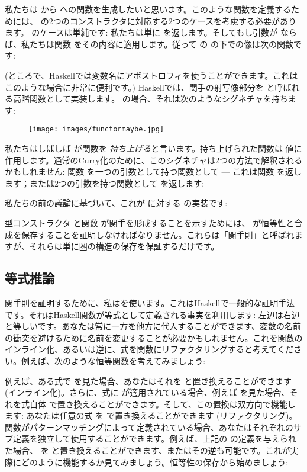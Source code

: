 私たちは  から  への関数を生成したいと思います。このような関数を定義するためには、 の2つのコンストラクタに対応する2つのケースを考慮する必要があります。 のケースは単純です: 私たちは単に  を返します。そしてもし引数が  ならば、私たちは関数  をその内容に適用します。従って  の  の下での像は次の関数です: 

 (ところで、Haskellでは変数名にアポストロフィを使うことができます。これはこのような場合に非常に便利です。) Haskellでは、関手の射写像部分を  と呼ばれる高階関数として実装します。 の場合、それは次のようなシグネチャを持ちます: 


\begin{figure}[H]
  \centering
  \texttt{[image: images/functormaybe.jpg]}
\end{figure}

\noindent
私たちはしばしば  が関数を \emph{持ち上げる}と言います。持ち上げられた関数は  値に作用します。通常のCurry化のために、このシグネチャは2つの方法で解釈されるかもしれません: 関数  を一つの引数として持つ関数として --- これは関数  を返します；または2つの引数を持つ関数として  を返します: 

私たちの前の議論に基づいて、これが  に対する  の実装です: 

型コンストラクタ  と関数  が関手を形成することを示すためには、 が恒等性と合成を保存することを証明しなければなりません。これらは「関手則」と呼ばれますが、それらは単に圏の構造の保存を保証するだけです。

\subsection{等式推論}

関手則を証明するために、私はを使います。これはHaskellで一般的な証明手法です。それはHaskell関数が等式として定義される事実を利用します: 左辺は右辺と等しいです。あなたは常に一方を他方に代入することができます、変数の名前の衝突を避けるために名前を変更することが必要かもしれません。これを関数のインライン化、あるいは逆に、式を関数にリファクタリングすると考えてください。例えば、次のような恒等関数を考えてみましょう: 

例えば、ある式で  を見た場合、あなたはそれを  と置き換えることができます (インライン化)。さらに、式に  が適用されている場合、例えば  を見た場合、それを式自体  で置き換えることができます。そして、この置換は双方向で機能します: あなたは任意の式  を  で置き換えることができます (リファクタリング)。関数がパターンマッチングによって定義されている場合、あなたはそれぞれのサブ定義を独立して使用することができます。例えば、上記の  の定義を与えられた場合、 を  と置き換えることができます、またはその逆も可能です。これが実際にどのように機能するか見てみましょう。恒等性の保存から始めましょう: 

